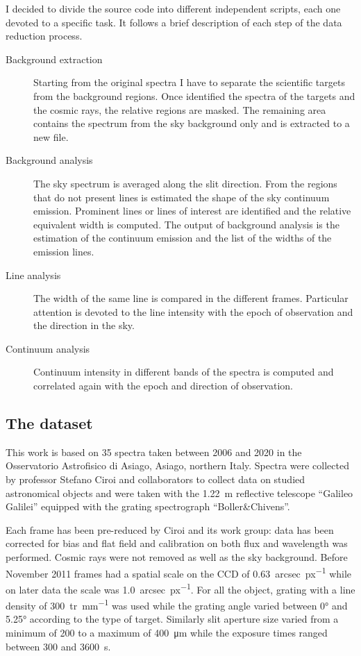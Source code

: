 I decided to divide the source code into different independent scripts, each one devoted to a specific task. It follows a brief description of each step of the data reduction process.
\begin{description}
	\item [Background extraction] Starting from the original spectra I have to separate the scientific targets from the background regions. Once identified the spectra of the targets and the cosmic rays, the relative regions are masked. The remaining area contains the spectrum from the sky background only and is extracted to a new file.
	\item [Background analysis] The sky spectrum is averaged along the slit direction. From the regions that do not present lines is estimated the shape of the sky continuum emission. Prominent lines or lines of interest are identified and the relative equivalent width is computed. The output of background analysis is the estimation of the continuum emission and the list of the widths of the emission lines.
	\item [Line analysis] The width of the same line is compared in the different frames. Particular attention is devoted to the line intensity with the epoch of observation and the direction in the sky.
	\item [Continuum analysis] Continuum intensity in different bands of the spectra is computed and correlated again with the epoch and direction of observation.
\end{description}

\subsection{The dataset}
This work is based on 35 spectra taken between 2006 and 2020 in the Osservatorio Astrofisico di Asiago, Asiago, northern Italy. Spectra were collected by professor Stefano Ciroi and collaborators to collect data on studied astronomical objects and were taken with the \SI{1.22}{m} reflective telescope ``Galileo Galilei'' equipped with the grating spectrograph ``Boller\&Chivens''.

Each frame has been pre-reduced by Ciroi and its work group: data has been corrected for bias and flat field and calibration on both flux and wavelength was performed. Cosmic rays were not removed as well as the sky background. Before November 2011 frames had a spatial scale on the CCD of \SI{0.63}{arcsec\per{px}} while on later data the scale was \SI{1.0}{arcsec\per{px}}. For all the object, grating with a line density of \SI{300}{tr\per{mm}} was used while the grating angle varied between \ang{0} and \ang{5.25} according to the type of target. Similarly slit aperture size varied from a minimum of 200 to a maximum of \SI{400}{\micro\metre} while the exposure times ranged between 300 and \SI{3600}{s}.

